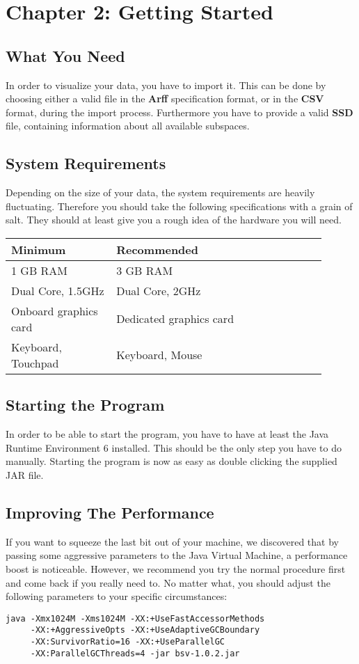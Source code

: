 
\section{\color{fancy}Chapter 2: Getting Started}

\subsection{What You Need}
In order to visualize your data, you have to import it. This can be done by choosing either a valid file in the \textbf{Arff} specification format, or in the \textbf{CSV} format, during the import process. Furthermore you have to provide a valid \textbf{SSD} file, containing information about all available subspaces.

\subsection{System Requirements}
Depending on the size of your data, the system requirements are heavily fluctuating. Therefore you should take the following specifications with a grain of salt. They should at least give you a rough idea of the hardware you will need.

\begin{tabular}{p{0.3\linewidth}p{0.6\linewidth}}
  \color{fancy}Minimum & \color{fancy}Recommended \\ \hline
  1 GB RAM & 3 GB RAM \\ \hline
  Dual Core, 1.5GHz & Dual Core, 2GHz \\ \hline
  Onboard graphics card & Dedicated graphics card \\ \hline
  Keyboard, Touchpad & Keyboard, Mouse\\ \hline
\end{tabular}

\subsection{Starting the Program}
In order to be able to start the program, you have to have at least the Java Runtime Environment 6 installed. This should be the only step you have to do manually. Starting the program is now as easy as double clicking the supplied JAR file.

\subsection{Improving The Performance}
If you want to squeeze the last bit out of your machine, we discovered that by passing some aggressive parameters to the Java Virtual Machine, a performance boost is noticeable. However, we recommend you try the normal procedure first and come back if you really need to. No matter what, you should adjust the following parameters to your specific circumstances:

\begin{framed}
\begin{verbatim}
java -Xmx1024M -Xms1024M -XX:+UseFastAccessorMethods
     -XX:+AggressiveOpts -XX:+UseAdaptiveGCBoundary
     -XX:SurvivorRatio=16 -XX:+UseParallelGC
     -XX:ParallelGCThreads=4 -jar bsv-1.0.2.jar
\end{verbatim}
\end{framed}
